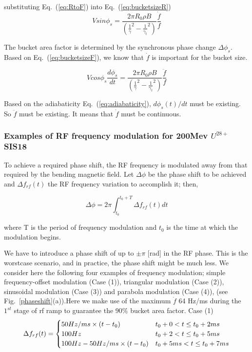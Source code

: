 substituting Eq.~(\ref{eq:RtoF}) into Eq.~(\ref{eq:bucketsizeR})
\begin{equation}
Vsin\phi_s=\frac{2\pi R_0 \rho B}{(\frac{1}{\gamma}^2-\frac{1}{\gamma_t}^2)}\frac{\dot f}{f} 
\label{eq:bucketsizeF}
\end{equation}

The bucket area factor is determined by the synchronous phase change $\Delta\phi_s$. Based on Eq.~(\ref{eq:bucketsizeF}), we know that $\dot f$ is important for the bucket size.


\begin{equation}
Vcos\phi_s\frac{d\phi_s}{dt}=\frac{2\pi R_0 \rho B}{(\frac{1}{\gamma}^2-\frac{1}{\gamma_t}^2)}\frac{\ddot f}{f} 
\label{eq:bucketsizeF}
\end{equation}

Based on the adiabaticity Eq.~(\ref{eq:adiabaticity}), $d\phi_s(t)/ dt$ must be existing. So $\ddot f$ must be existing. It means that  $\dot f$  must be continuous.

\subsubsection{Examples of RF frequency modulation for 200Mev $U^{28+}$ SIS18}
To achieve a required phase shift, the RF frequency is modulated away from that required by the bending magnetic field. Let $\Delta \phi$ be the phase shift to be achieved and $\Delta f_{rf}(t)$ the RF frequency variation to accomplish it; then,

\begin{equation}
\Delta \phi=2\pi \int_{t_0}^{t_0+T} \Delta f_{rf}(t)dt 
\label{eq:phaseshift}
\end{equation}

where T is the period of frequency modulation and $t_0$ is the time at which the modulation begins.

We have to introduce a phase shift of up to $\pm \pi$  [rad] in the RF phase. This is the worstcase scenario, and in practice, the phase shift might be much less.
We consider here the following four examples of frequency modulation; simple frequency-offset modulation (Case (1)), triangular modulation (Case (2)), sinusoidal modulation (Case (3)) and parabola modulation (Case (4)), (see Fig.~\ref{phaseshift}(a)).Here we make use of the maximum $\dot f$ 64 Hz/ms during the $1^{st}$ stage of rf ramp to guarantee the 90$\%$ bucket area factor.
Case (1) 
\begin{eqnarray}\Delta f_{rf}(t)=
\begin{cases}
50Hz/ms \times (t-t_0) &t_0+0<t\le t_0+2ms\cr  100Hz &t_0+2<t\le t_0+5ms \cr 100Hz-50Hz/ms \times (t-t_0) &t_0+5ms<t\le t_0+7ms\cr 
\end{cases}
\end{eqnarray}

